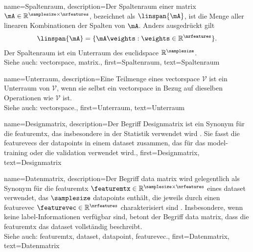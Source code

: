 {{{{
{
    name={Spaltenraum},
    description={Der Spaltenraum einer \gls{matrix} 
        $\mA \in \mathbb{R}^{\samplesize \times \nrfeatures}$, 
        bezeichnet als $\linspan{\mA}$, ist die Menge aller linearen Kombinationen 
        der Spalten von $\mA$. Anders ausgedrückt gilt
        $$
        \linspan{\mA} = \{ \mA \weights : \weights \in \mathbb{R}^{\nrfeatures} \}.
        $$
        Der Spaltenraum ist ein Unterraum des \gls{euclidspace} $\mathbb{R}^{\samplesize}$.
        \\
        Siehe auch: \gls{vectorspace}, \gls{matrix}.},
    first={Spaltenraum},
    text={Spaltenraum}
}

{
    name={Unterraum},
    description={Eine Teilmenge eines \gls{vectorspace} $\mathcal{V}$ ist ein Unterraum 
        von $\mathcal{V}$, wenn sie selbst ein \gls{vectorspace} in Bezug auf dieselben Operationen 
        wie $\mathcal{V}$ ist.
        \\
        Siehe auch: \gls{vectorspace}.},
    first={Unterraum},
    text={Unterraum}
}

{
    name={Designmatrix},
    description={Der Begriff  Designmatrix ist ein Synonym für die 
        \gls{featuremtx}, das insbesondere in der Statistik verwendet wird 
        \cite{Everitt2022,OxfordStatisticsDictionary}. 
        Sie fasst die \glspl{featurevec} der \glspl{datapoint} in einem \gls{dataset} zusammen, 
        das für das \gls{model}-\gls{training} oder die \gls{validation} verwendet wird.},
    first={Designmatrix},
    text={Designmatrix}
}

{
    name={Datenmatrix},
    description={Der Begriff  \gls{data} \gls{matrix} wird gelegentlich 
        als Synonym für die \gls{featuremtx} $\featuremtx \in \mathbb{R}^{\samplesize \times \nrfeatures}$ 
        eines \gls{dataset} verwendet, das $\samplesize$ \glspl{datapoint} enthält, 
        die jeweils durch einen \gls{featurevec} $\featurevec \in \mathbb{R}^{\nrfeatures}$ charakterisiert sind 
        \cite{Everitt2022}. 
        Insbesondere, wenn keine \gls{label}-Informationen verfügbar sind, betont der Begriff 
        \gls{data} \gls{matrix}, dass die \gls{featuremtx} das \gls{dataset} vollständig beschreibt.\\
        Siehe auch: \gls{featuremtx}, \gls{dataset}, \gls{datapoint}, \gls{featurevec}.},
    first={Datenmatrix},
    text={Datenmatrix}
}

}}}}
